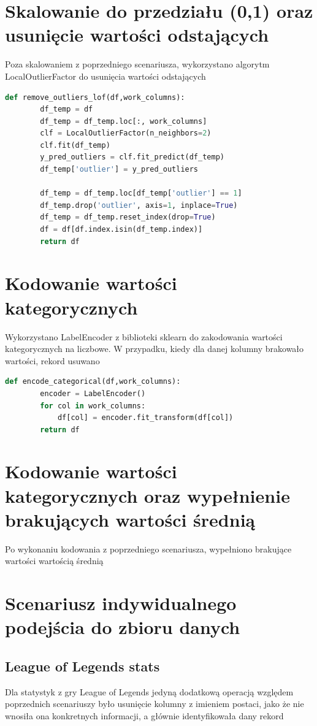 \documentclass{book}
\begin{document}
\section{Skalowanie do przedziału (0,1) oraz usunięcie 
wartości odstających}
Poza skalowaniem z poprzedniego scenariusza, 
wykorzystano algorytm LocalOutlierFactor do usunięcia 
wartości odstających

\begin{lstlisting}[language=Python, caption={Usuwanie wartości 
    odstających}, captionpos=b]
    def remove_outliers_lof(df,work_columns):
        df_temp = df
        df_temp = df_temp.loc[:, work_columns]
        clf = LocalOutlierFactor(n_neighbors=2)
        clf.fit(df_temp)
        y_pred_outliers = clf.fit_predict(df_temp)
        df_temp['outlier'] = y_pred_outliers

        df_temp = df_temp.loc[df_temp['outlier'] == 1]
        df_temp.drop('outlier', axis=1, inplace=True)
        df_temp = df_temp.reset_index(drop=True)
        df = df[df.index.isin(df_temp.index)]
        return df
\end{lstlisting}

\section{Kodowanie wartości kategorycznych}
Wykorzystano LabelEncoder z biblioteki sklearn do 
zakodowania wartości kategorycznych na liczbowe. 
W przypadku, kiedy dla danej kolumny brakowało wartości, 
rekord usuwano

\begin{lstlisting}[language=Python, caption={Usuwanie wartości 
    odstających}, captionpos=b]
    def encode_categorical(df,work_columns):
        encoder = LabelEncoder()
        for col in work_columns:
            df[col] = encoder.fit_transform(df[col])
        return df
\end{lstlisting}

\section{Kodowanie wartości kategorycznych oraz wypełnienie 
brakujących wartości średnią}
Po wykonaniu kodowania z poprzedniego scenariusza, 
wypełniono brakujące wartości wartością średnią
\section{Scenariusz indywidualnego podejścia do zbioru danych}
\subsection{League of Legends stats}
Dla statystyk z gry League of Legends jedyną dodatkową operacją względem poprzednich scenariuszy było usunięcie kolumny z 
imieniem postaci, jako że nie wnosiła ona konkretnych informacji, 
a głównie identyfikowała dany rekord
\end{document}
